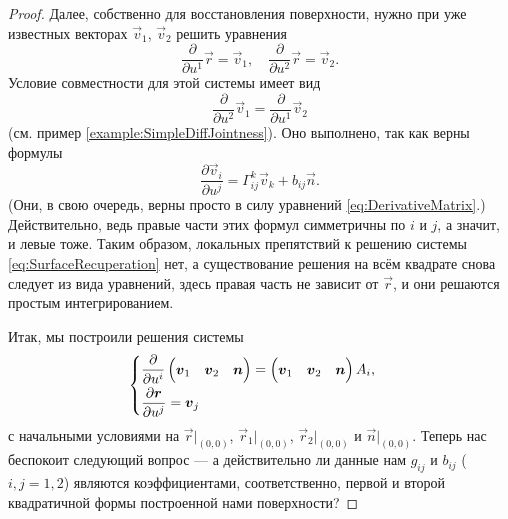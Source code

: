 \begin{proof}
	Далее, собственно для восстановления поверхности, нужно при уже известных векторах $\vec{v}_1$, $\vec{v}_2$ решить уравнения
	\begin{equation} \label{eq:SurfaceRecuperation}
		\frac{\partial}{\partial u^1}\vec{r} = \vec{v}_1,\quad
		\frac{\partial}{\partial u^2}\vec{r} = \vec{v}_2.
	\end{equation}
	Условие совместности для этой системы имеет вид
	\[
		\frac{\partial}{\partial u^2}\vec{v}_1 = \frac{\partial}{\partial u^1}\vec{v}_2
	\]
	(см. пример \ref{example:SimpleDiffJointness}). Оно выполнено, так как верны формулы
	\[
		\frac{\partial\vec{v}_i}{\partial u^j} = \Gamma_{ij}^k\vec{v}_k + b_{ij}\vec{n}.
	\]
	(Они, в свою очередь, верны просто в силу уравнений \eqref{eq:DerivativeMatrix}.) Действительно, ведь правые части этих формул симметричны по $i$ и $j$, а значит, и левые тоже. Таким образом, локальных препятствий к решению системы \eqref{eq:SurfaceRecuperation} нет, а существование решения на всём квадрате снова следует из вида уравнений, здесь правая часть не зависит от $\vec{r}$, и они решаются простым интегрированием.

	Итак, мы построили решения системы 
	\[
		\begin{cases}
			\begin{aligned}
				& \displaystyle\frac{\partial}{\partial u^i}
				\begin{pmatrix}
					\boldsymbol{v}_1 & \boldsymbol{v}_2 & \boldsymbol{n}
				\end{pmatrix} =
				\begin{pmatrix}
					\boldsymbol{v}_1 & \boldsymbol{v}_2 & \boldsymbol{n}
				\end{pmatrix}A_i,\\
				& \displaystyle\frac{\partial \boldsymbol{r}}{\partial u^j} = \boldsymbol{v}_j
			\end{aligned}
		\end{cases}
	\]
	с начальными условиями на $\vec{r}|_{(0, 0)}$, $\vec{r}_1|_{(0, 0)}$, $\vec{r}_2|_{(0, 0)}$ и $\vec{n}|_{(0, 0)}$. Теперь нас беспокоит следующий вопрос --- а действительно ли данные нам $g_{ij}$ и $b_{ij}$ ($i, j = 1, 2$) являются коэффициентами, соответственно, первой и второй квадратичной формы построенной нами поверхности?


\end{proof}
